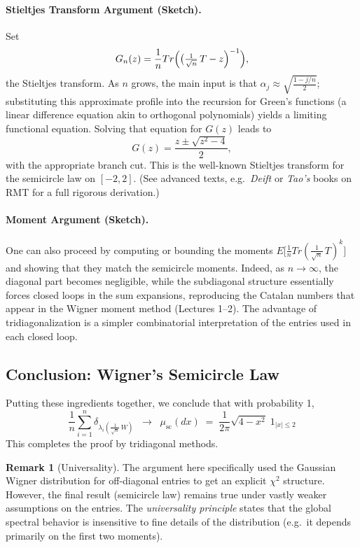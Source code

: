 \documentclass[letterpaper,11pt,oneside,reqno]{article}
\numberwithin{equation}{section}
\theoremstyle{definition}
\newtheorem{remark}[proposition]{Remark}
\begin{document}
\paragraph{Stieltjes Transform Argument (Sketch).}
Set
\[
  G_n(z)
  = \frac{1}{n}Tr\Bigl(\bigl(\tfrac{1}{\sqrt{n}}\,T - z\Bigr)^{-1}\Bigr),
\]
the Stieltjes transform. As $n$ grows, the main input is that $\alpha_j\approx \sqrt{\frac{1-j/n}{2}}$; substituting this approximate profile into the recursion for Green’s functions (a linear difference equation akin to orthogonal polynomials) yields a limiting functional equation. Solving that equation for $G(z)$ leads to
\[
  G(z) = \frac{z \pm \sqrt{z^2-4}}{2},
\]
with the appropriate branch cut. This is the well-known Stieltjes transform for the semicircle law on $[-2,2]$. (See advanced texts, e.g.\ \emph{Deift} or \emph{Tao’s} books on RMT for a full rigorous derivation.)

\paragraph{Moment Argument (Sketch).}
One can also proceed by computing or bounding the moments $ E\bigl[\frac{1}{n}Tr(\frac{1}{\sqrt{n}}\,T)^k\bigr]$ and showing that they match the semicircle moments. Indeed, as $n\to\infty$, the diagonal part becomes negligible, while the subdiagonal structure essentially forces closed loops in the sum expansions, reproducing the Catalan numbers that appear in the Wigner moment method (Lectures 1--2). The advantage of tridiagonalization is a simpler combinatorial interpretation of the entries used in each closed loop.

\subsection{Conclusion: Wigner’s Semicircle Law}

Putting these ingredients together, we conclude that with probability 1,
\[
  \frac{1}{n}\sum_{i=1}^n \delta_{\lambda_i(\frac1{\sqrt{n}}\,W)}
  \;\;\longrightarrow\;\;
  \mu_{\mathrm{sc}}(dx) \;=\; \frac{1}{2\pi}\sqrt{4-x^2}\; 1_{|x|\le2}
\]
This completes the proof by tridiagonal methods.

\begin{remark}[Universality]
The argument here specifically used the Gaussian Wigner distribution for off-diagonal entries to get an explicit $\chi^2$ structure. However, the final result (semicircle law) remains true under vastly weaker assumptions on the entries. The \emph{universality principle} states that the global spectral behavior is insensitive to fine details of the distribution (e.g.\ it depends primarily on the first two moments).
\end{remark}
\end{document}
